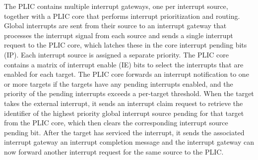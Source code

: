 The PLIC contains multiple interrupt gateways, one per interrupt source, together with a PLIC core that performs interrupt prioritization and routing. Global interrupts are sent from their source to an interrupt gateway that processes the interrupt signal from each source and sends a single interrupt request to the PLIC core, which latches these in the core interrupt pending bits (IP). Each interrupt source is assigned a separate priority. The PLIC core contains a matrix of interrupt enable (IE) bits to select the interrupts that are enabled for each target. The PLIC core forwards an interrupt notification to one or more targets if the targets have any pending interrupts enabled, and the priority of the pending interrupts exceeds a per-target threshold. When the target takes the external interrupt, it sends an interrupt claim request to retrieve the identifier of the highest priority global interrupt source pending for that target from the PLIC core, which then clears the corresponding interrupt source pending bit. After the target has serviced the interrupt, it sends the associated interrupt gateway an interrupt completion message and the interrupt gateway can now forward another interrupt request for the same source to the PLIC.